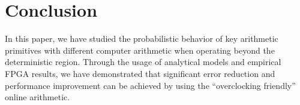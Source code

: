 \documentclass{acm_proc_article-sp}
\begin{document}
\section{Conclusion}
In this paper, we have studied the probabilistic behavior of key arithmetic primitives with different computer arithmetic when operating beyond the deterministic region. Through the usage of analytical models and empirical FPGA results, we have demonstrated that significant error reduction and performance improvement can be achieved by using the ``overclocking friendly'' online arithmetic.


%

%
\end{document}
